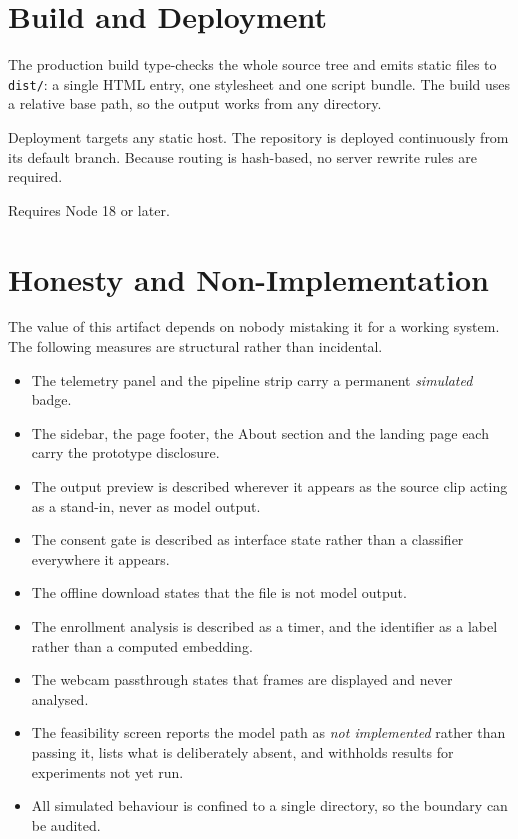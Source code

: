 \documentclass[11pt,a4paper]{report}
\newcommand{\code}[1]{\texttt{\small #1}}
\begin{document}
\chapter{Build and Deployment}

The production build type-checks the whole source tree and emits static files
to \code{dist/}: a single HTML entry, one stylesheet and one script bundle.
The build uses a relative base path, so the output works from any directory.

Deployment targets any static host. The repository is deployed continuously
from its default branch. Because routing is hash-based, no server rewrite
rules are required.

Requires Node 18 or later.

\chapter{Honesty and Non-Implementation}

The value of this artifact depends on nobody mistaking it for a working
system. The following measures are structural rather than incidental.

\begin{itemize}
  \item The telemetry panel and the pipeline strip carry a permanent
    \emph{simulated} badge.
  \item The sidebar, the page footer, the About section and the landing page
    each carry the prototype disclosure.
  \item The output preview is described wherever it appears as the source clip
    acting as a stand-in, never as model output.
  \item The consent gate is described as interface state rather than a
    classifier everywhere it appears.
  \item The offline download states that the file is not model output.
  \item The enrollment analysis is described as a timer, and the identifier as
    a label rather than a computed embedding.
  \item The webcam passthrough states that frames are displayed and never
    analysed.
  \item The feasibility screen reports the model path as \emph{not
    implemented} rather than passing it, lists what is deliberately absent, and
    withholds results for experiments not yet run.
  \item All simulated behaviour is confined to a single directory, so the
    boundary can be audited.
\end{itemize}
\end{document}
